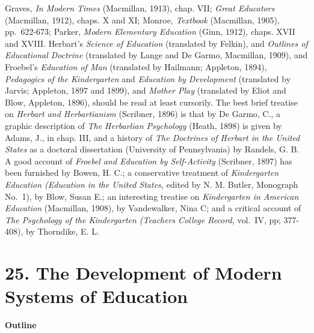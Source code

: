 \documentclass[]{book}
\begin{document}
Graves, \emph{In Modern Times} (Macmillan, 1913), chap. VII; \emph{Great Educators} (Macmillan, 1912), chaps. X and XI; Monroe, \emph{Textbook} (Macmillan, 1905), pp.~622-673; Parker, \emph{Modern Elementary Education} (Ginn, 1912), chaps. XVII and XVIII. Herbart's \emph{Science of Education} (translated by Felkin), and \emph{Outlines of Educational Doctrine} (translated by Lange and De Garmo, Macmillan, 1909), and Froebel's \emph{Education of Man} (translated by Hailmann; Appleton, 1894), \emph{Pedagogics of the Kindergarten} and \emph{Education by Development} (translated by Jarvis; Appleton, 1897 and 1899), and \emph{Mother Play} (translated by Eliot and Blow, Appleton, 1896), should be read at least cursorily. The best brief treatise on \emph{Herbart and Herbartianism} (Scribner, 1896) is that by De Garmo, C., a graphic description of \emph{The Herbarlian Psychology} (Heath, 1898) is given by Adams, J., in chap. III, and a history of \emph{The Doctrines of Herbart in the United States} as a doctoral dissertation (University of Pennsylvania) by Randels, G. B. A good account of \emph{Froebel and Education by Self-Activity} (Scribner, 1897) has been furnished by Bowen, H. C.; a conservative treatment of \emph{Kindergarten Education (Education in the United States,} edited by N. M. Butler, Monograph No.~1), by Blow, Susan E.; an interesting treatise on \emph{Kindergarten in American Education} (Macmillan, 1908), by Vandewalker, Nina C; and a critical account of \emph{The Psychology of the Kindergarten (Teachers College Record,} vol.~IV, pp; 377-408), by Thorndike, E. L.

\hypertarget{the-development-of-modern-systems-of-education}{%
\chapter{25. The Development of Modern Systems of Education}\label{the-development-of-modern-systems-of-education}}

\textbf{Outline}
\end{document}
